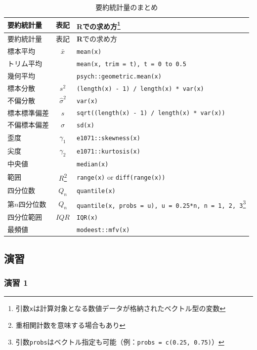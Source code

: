 \documentclass[
  12pt,
]{book}
\begin{document}
\begin{longtable}[]{@{}lcl@{}}
\caption{要約統計量のまとめ}\tabularnewline
\toprule
要約統計量 & 表記 & \textbf{R}での求め方\footnote{引数\texttt{x}は計算対象となる数値データが格納されたベクトル型の変数} \\
\midrule
\endfirsthead
\toprule
要約統計量 & 表記 & \textbf{R}での求め方{} \\
\midrule
\endhead
標本平均 & \(\bar{x}\) & \texttt{mean(x)} \\
トリム平均 & & \texttt{mean(x,\ trim\ =\ t),\ t\ =\ 0\ to\ 0.5} \\
幾何平均 & & \texttt{psych::geometric.mean(x)} \\
標本分散 & \(s^2\) & \texttt{(length(x)\ -\ 1)\ /\ length(x)\ *\ var(x)} \\
不偏分散 & \(\hat{\sigma}^2\) & \texttt{var(x)} \\
標本標準偏差 & \(s\) & \texttt{sqrt((length(x)\ -\ 1)\ /\ length(x)\ *\ var(x))} \\
不偏標本偏差 & \(\hat{\sigma}\) & \texttt{sd(x)} \\
歪度 & \(\gamma_1\) & \texttt{e1071::skewness(x)} \\
尖度 & \(\gamma_2\) & \texttt{e1071::kurtosis(x)} \\
中央値 & & \texttt{median(x)} \\
範囲 & \(R\)\footnote{重相関計数を意味する場合もあり} & \texttt{range(x)} or \texttt{diff(range(x))} \\
四分位数 & \(Q_n\) & \texttt{quantile(x)} \\
第\(n\)四分位数 & \(Q_n\) & \texttt{quantile(x,\ probs\ =\ u),\ u\ =\ 0.25*n,\ n\ =\ 1,\ 2,\ 3}\footnote{引数\texttt{probs}はベクトル指定も可能（例：\texttt{probs\ =\ c(0.25,\ 0.75)}）} \\
四分位範囲 & \(IQR\) & \texttt{IQR(x)} \\
最頻値 & & \texttt{modeest::mfv(x)} \\
\bottomrule
\end{longtable}

\newpage

\hypertarget{ux6f14ux7fd2}{%
\subsection{演習}\label{ux6f14ux7fd2}}

\hypertarget{ux6f14ux7fd2-1}{%
\subsubsection*{演習 1}\label{ux6f14ux7fd2-1}}
\end{document}
